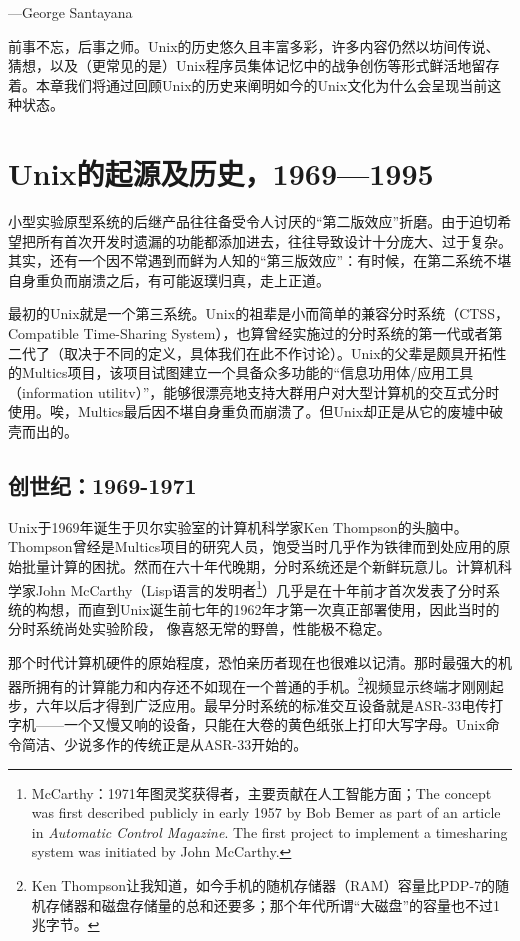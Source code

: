 \documentclass[12pt,oneside]{book}
\begin{document}
\begin{common-format}
\begin{flushright}
\begin{notecard}{17em}
{\hfill —George Santayana}
\end{notecard}
\end{flushright}

前事不忘，后事之师。Unix的历史悠久且丰富多彩，许多内容仍然以坊间传说、猜想，以及（更常见的是）Unix程序员集体记忆中的战争创伤等形式鲜活地留存着。本章我们将通过回顾Unix的历史来阐明如今的Unix文化为什么会呈现当前这种状态。

\section{Unix的起源及历史，1969—1995}
小型实验原型系统的后继产品往往备受令人讨厌的“第二版效应”折磨。由于迫切希望把所有首次开发时遗漏的功能都添加进去，往往导致设计十分庞大、过于复杂。其实，还有一个因不常遇到而鲜为人知的“第三版效应”：有时候，在第二系统不堪自身重负而崩溃之后，有可能返璞归真，走上正道。

最初的Unix就是一个第三系统。Unix的祖辈是小而简单的兼容分时系统（CTSS，Compatible Time-Sharing System），也算曾经实施过的分时系统的第一代或者第二代了（取决于不同的定义，具体我们在此不作讨论）。Unix的父辈是颇具开拓性的Multics项目，该项目试图建立一个具备众多功能的“信息功用体/应用工具（information utilitv）”，能够很漂亮地支持大群用户对大型计算机的交互式分时使用。唉，Multics最后因不堪自身重负而崩溃了。但Unix却正是从它的废墟中破壳而出的。

\subsection{创世纪：1969-1971}
Unix于1969年诞生于贝尔实验室的计算机科学家Ken Thompson的头脑中。Thompson曾经是Multics项目的研究人员，饱受当时几乎作为铁律而到处应用的原始批量计算的困扰。然而在六十年代晚期，分时系统还是个新鲜玩意儿。计算机科学家John McCarthy（Lisp语言的发明者\footnote{McCarthy：1971年图灵奖获得者，主要贡献在人工智能方面；The concept was first described publicly in early 1957 by Bob Bemer as part of an article in \textit{Automatic Control Magazine}.  The first project to implement a timesharing system was initiated by John McCarthy. }）几乎是在十年前才首次发表了分时系统的构想，而直到Unix诞生前七年的1962年才第一次真正部署使用，因此当时的分时系统尚处实验阶段，
像喜怒无常的野兽，性能极不稳定。

那个时代计算机硬件的原始程度，恐怕亲历者现在也很难以记清。那时最强大的机器所拥有的计算能力和内存还不如现在一个普通的手机。\footnote{Ken Thompson让我知道，如今手机的随机存储器（RAM）容量比PDP-7的随机存储器和磁盘存储量的总和还要多；那个年代所谓“大磁盘”的容量也不过1兆字节。}视频显示终端才刚刚起步，六年以后才得到广泛应用。最早分时系统的标准交互设备就是ASR-33电传打字机——一个又慢又响的设备，只能在大卷的黄色纸张上打印大写字母。Unix命令简洁、少说多作的传统正是从ASR-33开始的。


\end{common-format}
\end{document}
